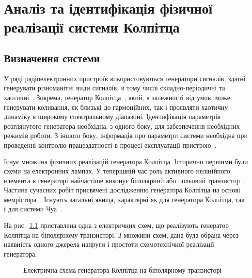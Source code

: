 \chapter{Аналіз та ідентифікація фізичної реалізації системи Колпітца}
\label{atu:ch:colpreal}


\section{Визначення системи}%
\label{atu:s:colp_task}


У ряді радіоелектронних пристроїв використовуються генератори
сигналів, здатні генерувати різноманітні види сигналів, в тому
числі складно-періодичні та хаотичні~\cite{dmitriev_gen_chaos}. Зокрема,
генератор Колпітца~\cite{kennedy_chaos_colpitts,atu_asau21,Kennedy_Colpitts_predicting}, який,
в залежності від умов, може генерувати коливання, як близькі
до гармонійних, так і проявляти хаотичну динаміку в широкому
спектральному діапазоні. Ідентифікація параметрів розглянутого
генератора необхідна, з одного боку, для забезпечення необхідних
режимів роботи. З іншого боку, інформація про параметри системи
необхідна при проведенні контролю працездатності в процесі
експлуатації пристрою~\cite{atu_apir2013}.

Існує множина фізичних реалізацій генератора Колпітца. Історично
першими були схеми на електронних лампах. У теперішній час роль
активного нелінійного елемента в генераторі найчастіше виконує
біполярний або польовий транзистор~\cite{doi:10.1063/1.4705999}. Частина
сучасних робіт присвячені дослідженню генератора Колпітца на
основі мемрістора~\cite{DBLP:journals/corr/WangWQ15}. Існують загальні
явища, характерні як для генератора Колпітца, так і для
системи Чуа~\cite{Kennedy_Colpitts_Chua}.


На рис.~\ref{atu:f:colp_schem} приставлена одна з електричних схем,
що реалізують генератор Колпітца на біполярному транзисторі. З
множини схем, дана була обрана через наявність одного джерела
напруги і простоти схемотехнічної реалізації генератора.


\begin{figure}[htb!]
\begin{center}

\end{center}
\caption{Електрична схема генератора Колпітца на біполярному транзисторі}
\label{atu:f:colp_schem}
\end{figure}

